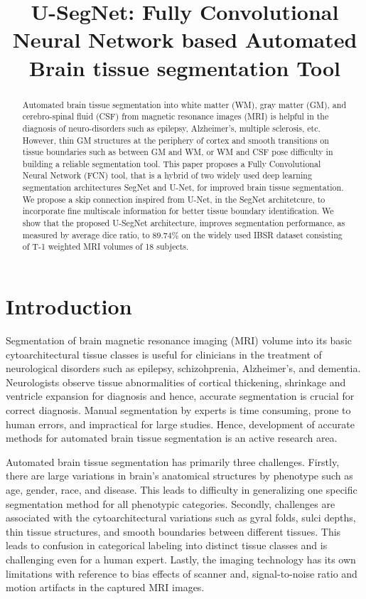 \documentclass{article}
\title{U-SegNet: Fully Convolutional Neural Network based Automated Brain tissue segmentation Tool}
\begin{document}
\maketitle
\begin{abstract}

Automated brain tissue segmentation into white matter (WM), gray matter (GM), and cerebro-spinal fluid (CSF) from magnetic resonance images (MRI) is helpful in the diagnosis of neuro-disorders such as epilepsy, Alzheimer's, multiple sclerosis, etc. However, thin GM structures at the periphery of cortex and smooth transitions on tissue boundaries such as between GM and WM, or WM and CSF pose difficulty in building a reliable segmentation tool. This paper proposes a Fully Convolutional Neural Network (FCN) tool, that is a hybrid of two widely used deep learning segmentation architectures SegNet and U-Net, for improved brain tissue segmentation. We propose a skip connection inspired from U-Net, in the SegNet architetcure, to incorporate fine multiscale information for better tissue boundary identification. We show that the proposed U-SegNet architecture, improves segmentation performance, as measured by average dice ratio, to $89.74\%$ on the widely used IBSR dataset consisting of T-1 weighted MRI volumes of 18 subjects.
\end{abstract}

\section{Introduction}
\label{sec:intro}

Segmentation of brain magnetic resonance imaging (MRI) volume into its basic cytoarchitectural tissue classes is useful for clinicians in the treatment of neurological disorders such as epilepsy, schizohprenia, Alzheimer's, and dementia. Neurologists observe tissue abnormalities of cortical thickening, shrinkage and ventricle expansion for diagnosis and hence, accurate segmentation is crucial for correct diagnosis. Manual segmentation by experts is time consuming, prone to human errors, and impractical for large studies. Hence, development of accurate methods for automated brain tissue segmentation is an active research area.

Automated brain tissue segmentation has primarily three challenges.  Firstly, there are large variations in brain's anatomical structures by phenotype such as age, gender, race, and disease. This leads to difficulty in generalizing one specific segmentation method for all phenotypic categories.  Secondly, challenges are associated with the cytoarchitectural variations such as gyral folds, sulci depths, thin tissue structures, and smooth boundaries between different tissues. This leads to confusion in categorical labeling into distinct tissue classes and is challenging even for a human expert. Lastly, the imaging technology has its own limitations with reference to bias effects of scanner and, signal-to-noise ratio and motion artifacts in the captured MRI images.
\end{document}
